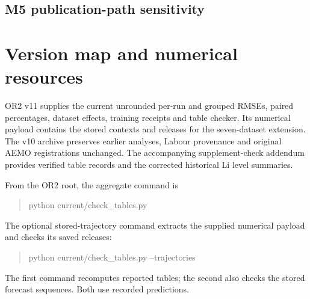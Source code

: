 \subsection{M5 publication-path sensitivity}\label{sec:m5path}


\FloatBarrier
{}
\FloatBarrier

\section{Version map and numerical resources}\label{sec:resources}
OR2 v11 supplies the current unrounded per-run and grouped RMSEs,
paired percentages, dataset effects, training receipts and table checker.
Its numerical payload contains the stored contexts and releases for the
seven-dataset extension. The v10 archive preserves earlier analyses,
Labour provenance and original AEMO registrations unchanged.
The accompanying supplement-check addendum provides verified table
records and the corrected historical Li level summaries.

From the OR2 root, the aggregate command is
\begin{quote}\footnotesize\ttfamily
python current/check\_tables.py
\end{quote}
The optional stored-trajectory command extracts the supplied numerical
payload and checks its saved releases:
\begin{quote}\footnotesize\ttfamily
python current/check\_tables.py --trajectories
\end{quote}
The first command recomputes reported tables; the second also checks
the stored forecast sequences. Both use recorded predictions.
